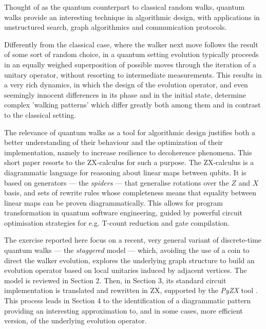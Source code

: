 
Thought of as the quantum counterpart to classical random walks, quantum walks \cite{QW-overview} provide an interesting technique in algorithmic design, 
with  applications in unstructured search, graph algorithmics and communication protocols.

Differently from the classical case, where the  walker next move follows the result of some sort of random choice, in a quantum setting evolution typically 
proceeds in an equally weighed superposition of possible moves through the iteration of a unitary operator, without resorting to intermediate measurements. 
This results in a very rich dynamics, in which the design of the evolution operator, and even seemingly
innocent differences  in its phase  and in the initial state, determine complex 'walking patterns'  
which differ greatly both among them and in contrast to the classical setting.

The relevance of quantum walks as a tool for algorithmic design justifies both a better understanding of their behaviour and the optimization of their implementation, namely to increase resilience to decoherence phenomena. This short paper resorts to the ZX-calculus \cite{CoeckeD08,ZX-overview,CoeckeHKW22} for such a purpose. The ZX-calculus is a diagrammatic language for reasoning about linear maps between qubits. It is based on generators --- the \emph{spiders} --- that generalise rotations over the $Z$ and $X$ basis, and sets of rewrite rules whose completeness means that  equality between linear maps can be proven diagrammatically. This allows for program transformation in quantum software engineering, guided by powerful  circuit optimisation strategies for e.g. T-count reduction and gate compilation.

The exercise reported here focus on a recent, very general variant of discrete-time quantum walks --- the \emph{staggered}
 model  \cite{PortugalSFG16} --- which, avoiding the use of a coin to direct the walker evolution, explores the underlying graph structure to build an evolution operator based on local unitaries induced by adjacent vertices.  The model is reviewed in Section 2. Then, in Section 3, its standard circuit implementation is translated and rewritten in ZX, supported by  the \textit{PyZX} tool \cite{pyzx}. This process leads in Section 4 to the identification of a diagrammatic pattern providing an interesting approximation to, and in some cases,  more efficient version, of the underlying evolution operator.  



